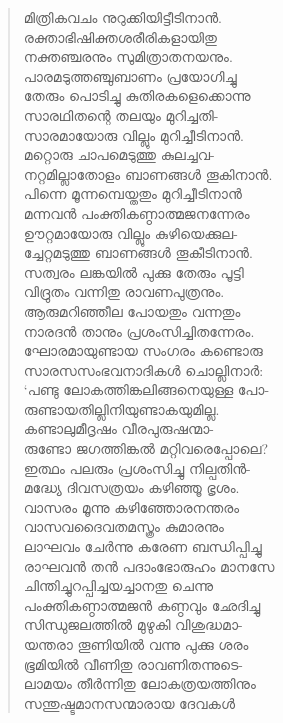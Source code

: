 \begin{verse}
മിത്രികവചം നുറുക്കിയിട്ടീടിനാന്‍.\\
രക്താഭിഷിക്തശരീരികളായിതു\\
നക്തഞ്ചരനും സുമിത്രാതനയനും.\\
പാരമടുത്തഞ്ചുബാണം പ്രയോഗിച്ചു\\
തേരും പൊടിച്ചു കുതിരകളെക്കൊന്നു\\
സാരഥിതന്റെ തലയും മുറിച്ചതി-\\
സാരമായോരു വില്ലും മുറിച്ചീടിനാന്‍.\\
മറ്റൊരു ചാപമെടുത്തു കുലച്ചവ-\\
നറ്റമില്ലാതോളം ബാണങ്ങള്‍ തൂകിനാന്‍.\\
പിന്നെ മൂന്നമ്പെയ്തതും മുറിച്ചീടിനാന്‍\\
മന്നവന്‍ പംക്തികണ്ഠാത്മജനന്നേരം\\
ഊറ്റമായോരു വില്ലും കുഴിയെക്കുല-\\
ച്ചേറ്റമടുത്തു ബാണങ്ങള്‍ തൂകീടിനാന്‍.\\
സത്വരം ലങ്കയില്‍ പുക്കു തേരും പൂട്ടി\\
വിദ്രുതം വന്നിതു രാവണപുത്രനും.\\
ആരുമറിഞ്ഞീല പോയതും വന്നതും\\
നാരദന്‍ താനും പ്രശംസിച്ചിതന്നേരം.\\
ഘോരമായുണ്ടായ സംഗരം കണ്ടൊരു\\
സാരസസംഭവനാദികള്‍ ചൊല്ലിനാര്‍:\\
‘പണ്ടു ലോകത്തിങ്കലിങ്ങനെയുള്ള പോ-\\
രുണ്ടായതില്ലിനിയുണ്ടാകയുമില്ല.\\
കണ്ടാലുമീദൃഷം വീരപുരുഷന്മാ-\\
രുണ്ടോ ജഗത്തിങ്കല്‍ മറ്റിവരെപ്പോലെ?\\
ഇത്ഥം പലരും പ്രശംസിച്ചു നില്പതിന്‍-\\
മദ്ധ്യേ ദിവസത്രയം കഴിഞ്ഞൂ ഭൃശം.\\
വാസരം മൂന്നു കഴിഞ്ഞോരനന്തരം\\
വാസവദൈവതമസ്ത്രം കുമാരനും\\
ലാഘവം ചേര്‍ന്നു കരേണ ബന്ധിപ്പിച്ചു\\
രാഘവന്‍ തന്‍ പദാംഭോരുഹം മാനസേ\\
ചിന്തിച്ചുറപ്പിച്ചയച്ചാനതു ചെന്നു\\
പംക്തികണ്ഠാത്മജന്‍ കണ്ഠവും ഛേദിച്ചു\\
സിന്ധുജലത്തില്‍ മുഴുകി വിശുദ്ധമാ-\\
യന്തരാ തൂണിയില്‍ വന്നു പുക്കു ശരം\\
ഭൂമിയില്‍ വീണിതു രാവണിതന്നുടെ-\\
ലാമയം തീര്‍ന്നിതു ലോകത്രയത്തിനും\\
സന്തുഷ്ടമാനസന്മാരായ ദേവകള്‍\\

\end{verse}
